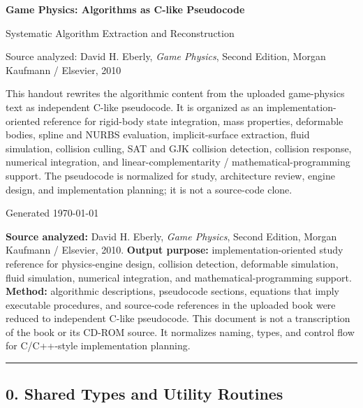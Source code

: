 \documentclass[10pt,letterpaper]{article}
\newcommand{\handouttitle}{Game Physics: Algorithms as C-like Pseudocode}
\begin{document}
\begin{titlepage}
\centering
\vspace*{0.85in}
{\Huge\bfseries\color{HouseBlue}\handouttitle\par}
\vspace{0.22in}
{\Large Systematic Algorithm Extraction and Reconstruction\par}
\vspace{0.34in}
{\large Source analyzed: David H. Eberly, \emph{Game Physics}, Second Edition, Morgan Kaufmann / Elsevier, 2010\par}
\vfill
\begin{minipage}{0.88\textwidth}
\small
This handout rewrites the algorithmic content from the uploaded game-physics text as independent C-like pseudocode. It is organized as an implementation-oriented reference for rigid-body state integration, mass properties, deformable bodies, spline and NURBS evaluation, implicit-surface extraction, fluid simulation, collision culling, SAT and GJK collision detection, collision response, numerical integration, and linear-complementarity / mathematical-programming support. The pseudocode is normalized for study, architecture review, engine design, and implementation planning; it is not a source-code clone.
\end{minipage}
\vfill
{\large Generated \today\par}
\end{titlepage}
\clearpage
{}
\tableofcontents
\clearpage
{}


\textbf{Source analyzed:} David H. Eberly, \emph{Game Physics}, Second Edition, Morgan Kaufmann / Elsevier, 2010.
\textbf{Output purpose:} implementation-oriented study reference for physics-engine design, collision detection, deformable simulation, fluid simulation, numerical integration, and mathematical-programming support.
\textbf{Method:} algorithmic descriptions, pseudocode sections, equations that imply executable procedures, and source-code references in the uploaded book were reduced to independent C-like pseudocode. This document is not a transcription of the book or its CD-ROM source. It normalizes naming, types, and control flow for C/C++-style implementation planning.

\medskip\hrule\medskip

\subsection*{0. Shared Types and Utility Routines}
\end{document}
